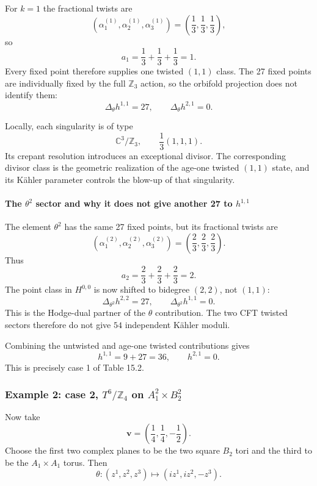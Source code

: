 \documentclass[
  10pt,
  a4paper,
  openany]{book}
\begin{document}
For \(k=1\) the fractional twists are \[
\left(
\alpha_1^{(1)},\alpha_2^{(1)},\alpha_3^{(1)}
\right)
=
\left(\frac13,\frac13,\frac13\right),
\] so \[
a_1=\frac13+\frac13+\frac13=1.
\] Every fixed point therefore supplies one twisted \((1,1)\) class. The
27 fixed points are individually fixed by the full \(\mathbb Z_3\)
action, so the orbifold projection does not identify them: \[
\boxed{
\Delta_{\theta}h^{1,1}=27,
\qquad
\Delta_{\theta}h^{2,1}=0
}.
\]

Locally, each singularity is of type \[
\mathbb C^3/\mathbb Z_3,
\qquad
\frac13(1,1,1).
\] Its crepant resolution introduces an exceptional divisor. The
corresponding divisor class is the geometric realization of the age-one
twisted \((1,1)\) state, and its Kähler parameter controls the blow-up
of that singularity.

\paragraph{\texorpdfstring{The \(\theta^2\) sector and why it does not
give another 27 to
\(h^{1,1}\)}{The \textbackslash theta\^{}2 sector and why it does not give another 27 to h\^{}\{1,1\}}}\label{the-theta2-sector-and-why-it-does-not-give-another-27-to-h11}

The element \(\theta^2\) has the same 27 fixed points, but its
fractional twists are \[
\left(
\alpha_1^{(2)},\alpha_2^{(2)},\alpha_3^{(2)}
\right)
=
\left(\frac23,\frac23,\frac23\right).
\] Thus \[
a_2=\frac23+\frac23+\frac23=2.
\] The point class in \(H^{0,0}\) is now shifted to bidegree \((2,2)\),
not \((1,1)\): \[
\Delta_{\theta^2}h^{2,2}=27,
\qquad
\Delta_{\theta^2}h^{1,1}=0.
\] This is the Hodge-dual partner of the \(\theta\) contribution. The
two CFT twisted sectors therefore do not give \(54\) independent Kähler
moduli.

Combining the untwisted and age-one twisted contributions gives \[
\boxed{
h^{1,1}=9+27=36,
\qquad
h^{2,1}=0
}.
\] This is precisely case 1 of Table 15.2.

\subsubsection{\texorpdfstring{Example 2: case 2, \(T^6/\mathbb Z_4\) on
\(A_1^2\times B_2^2\)}{Example 2: case 2, T\^{}6/\textbackslash mathbb Z\_4 on A\_1\^{}2\textbackslash times B\_2\^{}2}}\label{example-2-case-2-t6mathbb-z_4-on-a_12times-b_22}

Now take \[
\mathbf v
=
\left(\frac14,\frac14,-\frac12\right).
\] Choose the first two complex planes to be the two square \(B_2\) tori
and the third to be the \(A_1\times A_1\) torus. Then \[
\theta:(z^1,z^2,z^3)
\longmapsto
(iz^1,iz^2,-z^3).
\]
\end{document}

